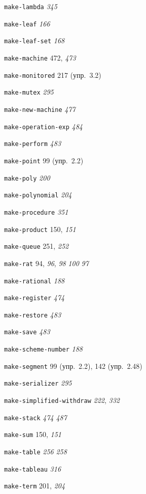 \begin{theindex}
\item {\texttt{make-lambda}} {\it 345}
\item {\texttt{make-leaf}} {\it 166}
\item {\texttt{make-leaf-set}} {\it 168}
\item {\texttt{make-machine}} 472, {\it 473}
\item {\texttt{make-monitored}} 217 (упр.~3.2)
\item {\texttt{make-mutex}} {\it 295}
\item {\texttt{make-new-machine}} {\it 477}
\item {\texttt{make-operation-exp}} {\it 484}
\item {\texttt{make-perform}} {\it 483}
\item {\texttt{make-point}} 99 (упр.~2.2)
\item {\texttt{make-poly}} {\it 200}
\item {\texttt{make-polynomial}} {\it 204}
\item {\texttt{make-procedure}} {\it 351}
\item {\texttt{make-product}} 150, {\it 151}
\item {\texttt{make-queue}} 251, {\it 252}
\item {\texttt{make-rat}} 94, {\it 96}, {\it 98}
   {\it 100}
   {\it 97}
\item {\texttt{make-rational}} {\it 188}
\item {\texttt{make-register}} {\it 474}
\item {\texttt{make-restore}} {\it 483}
\item {\texttt{make-save}} {\it 483}
\item {\texttt{make-scheme-number}} {\it 188}
\item {\texttt{make-segment}} 99 (упр.~2.2), 142 (упр.~2.48)
\item {\texttt{make-serializer}} {\it 295}
\item {\texttt{make-simplified-withdraw}} {\it 222}, {\it 332}
\item {\texttt{make-stack}} {\it 474}
   {\it 487}
\item {\texttt{make-sum}} 150, {\it 151}
\item {\texttt{make-table}}
   {\it 256}
   {\it 258}
\item {\texttt{make-tableau}} {\it 316}
\item {\texttt{make-term}} 201, {\it 204}

\end{theindex}

